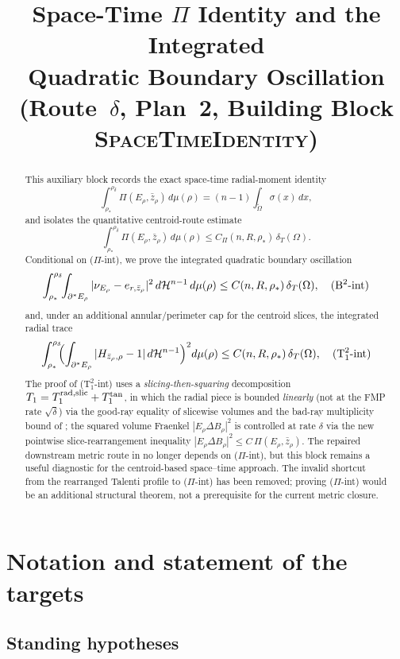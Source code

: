 \documentclass[11pt]{article}
\title{Space-Time $\Pi$ Identity and the Integrated\\
       Quadratic Boundary Oscillation\\
       (Route~$\delta$, Plan~2, Building Block \textsc{SpaceTimeIdentity})}
\author{}
\date{}
\theoremstyle{definition}
\newcommand{\Om}{\Omega}
\newcommand{\rstar}{\rho_{*}}
\newcommand{\zbar}{\bar z_{\rho}}
\newcommand{\er}{e_{r,\zbar}}
\newcommand{\PiE}{\Pi(E_{\rho},\zbar)}
\begin{document}
\maketitle

\begin{abstract}
This auxiliary block records the exact space-time radial-moment identity
\[
   \int_{\rstar}^{\rho_{\delta}}\PiE\,d\mu(\rho)
   =(n-1)\!\int_{\widetilde{\Om}}\!\sigma(x)\,dx,
\]
and isolates the quantitative centroid-route estimate
\[
   \int_{\rstar}^{\rho_\delta}\PiE\,d\mu(\rho)
   \le C_\Pi(n,R,\rstar)\,\delta_T(\Om).
\tag{$\Pi$-int}
\]
Conditional on \textup{($\Pi$-int)}, we prove the integrated
quadratic boundary oscillation
\[
   \int_{\rstar}^{\rho_{\delta}}\!\!\int_{\partial^{*}E_{\rho}}|\nu_{E_{\rho}}-\er|^{2}\,d\mathcal H^{n-1}\,d\mu(\rho)
   \le C(n,R,\rstar)\,\delta_{T}(\Om),
   \quad\textup{(B$^{2}$-int)}
\]
and, under an additional annular/perimeter cap for the centroid slices, the
integrated radial trace
\[
   \int_{\rstar}^{\rho_{\delta}}\!\!\Bigl(\int_{\partial^{*}E_{\rho}}|H_{\zbar,\rho}-1|\,d\mathcal H^{n-1}\Bigr)^{2}d\mu(\rho)
   \le C(n,R,\rstar)\,\delta_{T}(\Om),
   \quad\textup{(T$_{1}^{2}$-int)}
\]
The proof of (T$_{1}^{2}$-int) uses a
\emph{slicing-then-squaring} decomposition $T_{1}=T_{1}^{\rm rad,slic}+T_{1}^{\rm tan}$,
in which the radial piece is bounded \emph{linearly} (not at the FMP
rate $\sqrt{\delta}$) via the good-ray equality of slicewise volumes
and the bad-ray multiplicity bound of \cite{LevelSetIdentity}; the
squared volume Fraenkel $|E_{\rho}\Delta B_{\rho}|^{2}$ is controlled
at rate $\delta$ via the new pointwise slice-rearrangement inequality
$|E_{\rho}\Delta B_{\rho}|^{2}\le C\,\PiE$. The repaired downstream
metric route in \cite{WeightedMetricTrace} no longer depends on
\textup{($\Pi$-int)}, but this block remains a useful diagnostic for the
centroid-based space--time approach.
The invalid shortcut from the rearranged Talenti profile to
\textup{($\Pi$-int)} has been removed; proving \textup{($\Pi$-int)}
would be an additional structural theorem, not a prerequisite for the
current metric closure.
\end{abstract}

\section{Notation and statement of the targets}\label{sec:targets}

\subsection{Standing hypotheses}
\end{document}

